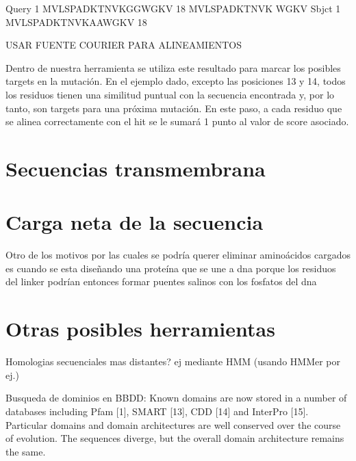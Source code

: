 Query  1   MVLSPADKTNVKGGWGKV  18
           MVLSPADKTNVK  WGKV
Sbjct  1   MVLSPADKTNVKAAWGKV  18

USAR FUENTE COURIER PARA ALINEAMIENTOS

Dentro de nuestra herramienta se utiliza este resultado para marcar los posibles targets en la mutación. En el ejemplo dado, excepto las posiciones 13 y 14, todos los residuos tienen una similitud puntual con la secuencia encontrada y, por lo tanto, son targets para una próxima mutación.
En este paso, a cada residuo que se alinea correctamente con el hit se le sumará 1 punto al valor de score asociado.



























\section{Secuencias transmembrana}
\cite{sonnhammer1998hidden}
\cite{krogh2001predicting}


\section{Carga neta de la secuencia}

Otro de los motivos por las cuales se podría querer eliminar aminoácidos cargados es cuando se esta diseñando una proteína que se une a dna porque los residuos del linker podrían 
entonces formar puentes salinos con los fosfatos del dna



\section{Otras posibles herramientas}
Homologias secuenciales mas distantes? ej mediante HMM (usando HMMer por ej.)

Busqueda de dominios en BBDD: Known domains are now stored in a number of databases including Pfam [1], SMART [13], CDD [14] and InterPro [15]. %
Particular domains and domain architectures are well conserved over the course of evolution. The sequences diverge, but the overall domain architecture remains the same.


